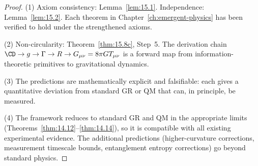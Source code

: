 \begin{proof}
(1) Axiom consistency: Lemma~\ref{lem:15.1}.  Independence:
Lemma~\ref{lem:15.2}.  Each theorem in Chapter~\ref{ch:emergent-physics}
has been verified to hold under the strengthened axioms.

(2) Non-circularity: Theorem~\ref{thm:15.8c}, Step~5.  The derivation
chain $\CD \to g \to \Gamma \to R \to G_{\mu\nu} = 8\pi G T_{\mu\nu}$
is a forward map from information-theoretic primitives to gravitational
dynamics.

(3) The predictions are mathematically explicit and falsifiable: each
gives a quantitative deviation from standard GR or QM that can, in
principle, be measured.

(4) The framework reduces to standard GR and QM in the appropriate limits
(Theorems~\ref{thm:14.12}--\ref{thm:14.14}), so it is compatible with
all existing experimental evidence.  The additional predictions
(higher-curvature corrections, measurement timescale bounds, entanglement
entropy corrections) go beyond standard physics.
\end{proof}
